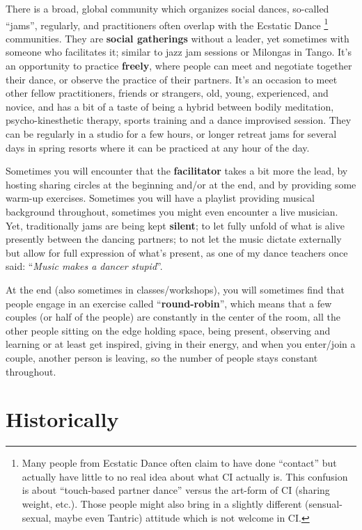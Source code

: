 There is a broad, global community which organizes social dances, so-called ``jams'', regularly, and practitioners often overlap with the Ecstatic Dance \footnote{Many people from Ecstatic Dance often claim to have done ``contact'' but actually have little to no real idea about what CI actually is. This confusion is about ``touch-based partner dance'' versus the art-form of CI (sharing weight, etc.). Those people might also bring in a slightly different (sensual-sexual, maybe even Tantric) attitude which is not welcome in CI.} communities.
They are \textbf{social gatherings} without a leader, yet sometimes with someone who facilitates it; similar to jazz jam sessions or Milongas in Tango.
It's an opportunity to practice \textbf{freely}, where people can meet and negotiate together their dance, or observe the practice of their partners.
It's an occasion to meet other fellow practitioners, friends or strangers, old, young, experienced, and novice, and has a bit of a taste of being a hybrid between bodily meditation, psycho-kinesthetic therapy, sports training and a dance improvised session.
They can be regularly in a studio for a few hours, or longer retreat jams for several days in spring resorts where it can be practiced at any hour of the day.

Sometimes you will encounter that the \textbf{facilitator} takes a bit more the lead, by hosting sharing circles at the beginning and/or at the end, and by providing some warm-up exercises.
Sometimes you will have a playlist providing musical background throughout, sometimes you might even encounter a live musician.
Yet, traditionally jams are being kept \textbf{silent}; to let fully unfold of what is alive presently between the dancing partners; to not let the music dictate externally but allow for full expression of what's present, as one of my dance teachers once said: ``\textit{Music makes a dancer stupid}''.

At the end (also sometimes in classes/workshops), you will sometimes find that people engage in an exercise called ``\textbf{round-robin}'', which means that a few couples (or half of the people) are constantly in the center of the room, all the other people sitting on the edge holding space, being present, observing and learning or at least get inspired, giving in their energy, and when you enter/join a couple, another person is leaving, so the number of people stays constant throughout.

\section{Historically}\label{sec:historically}

